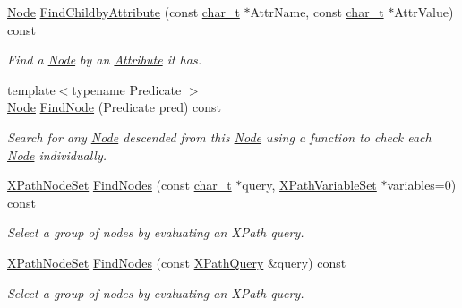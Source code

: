 \begin{DoxyCompactItemize}
\hyperlink{classphys_1_1xml_1_1Node}{Node} \hyperlink{classphys_1_1xml_1_1Node_aa39ea17d1d1b25edeca148ab00bb4b87}{FindChildbyAttribute} (const \hyperlink{namespacephys_1_1xml_afc87705cd1c2917d87b879715a2d8f6e}{char\_\-t} $\ast$AttrName, const \hyperlink{namespacephys_1_1xml_afc87705cd1c2917d87b879715a2d8f6e}{char\_\-t} $\ast$AttrValue) const 
\begin{DoxyCompactList}\small\item\em Find a \hyperlink{classphys_1_1xml_1_1Node}{Node} by an \hyperlink{classphys_1_1xml_1_1Attribute}{Attribute} it has. \item\end{DoxyCompactList}\item 
{\footnotesize template$<$typename Predicate $>$ }\\\hyperlink{classphys_1_1xml_1_1Node}{Node} \hyperlink{classphys_1_1xml_1_1Node_ab2311cefdf1d7f4886cbebd7350d7731}{FindNode} (Predicate pred) const 
\begin{DoxyCompactList}\small\item\em Search for any \hyperlink{classphys_1_1xml_1_1Node}{Node} descended from this \hyperlink{classphys_1_1xml_1_1Node}{Node} using a function to check each \hyperlink{classphys_1_1xml_1_1Node}{Node} individually. \item\end{DoxyCompactList}\item 
\hyperlink{classphys_1_1xml_1_1XPathNodeSet}{XPathNodeSet} \hyperlink{classphys_1_1xml_1_1Node_a7390ba1c09b83544365abc7bf8ec5b8f}{FindNodes} (const \hyperlink{namespacephys_1_1xml_afc87705cd1c2917d87b879715a2d8f6e}{char\_\-t} $\ast$query, \hyperlink{classphys_1_1xml_1_1XPathVariableSet}{XPathVariableSet} $\ast$variables=0) const 
\begin{DoxyCompactList}\small\item\em Select a group of nodes by evaluating an XPath query. \item\end{DoxyCompactList}\item 
\hyperlink{classphys_1_1xml_1_1XPathNodeSet}{XPathNodeSet} \hyperlink{classphys_1_1xml_1_1Node_a466766bf750da2a04acd8a32d2b8a458}{FindNodes} (const \hyperlink{classphys_1_1xml_1_1XPathQuery}{XPathQuery} \&query) const 
\begin{DoxyCompactList}\small\item\em Select a group of nodes by evaluating an XPath query. \item\end{DoxyCompactList}\item 

\end{DoxyCompactItemize}

